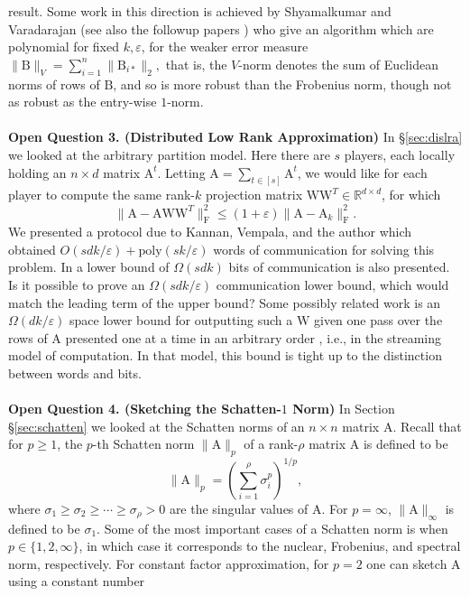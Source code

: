 \documentclass[11pt]{article}
\newcommand{\FNormS}[1]{\mbox{}\|#1\|_\mathrm{F}^2}
\newcommand{\mat}[1]{{\ensuremath{\bm{\mathrm{#1}}}}}
\def\matA{\mat{A}}
\def\matB{\mat{B}}
\def\matW{\mat{W}}
\newcommand{\eps}{\varepsilon}
\newcommand{\poly}{{\mathrm{poly}}}
\begin{document}
result. Some work in this direction is achieved by Shyamalkumar and Varadarajan \cite{SV07} 
(see also the followup papers \cite{DV07,FMSW10,FL11,VX12}) who give an algorithm which
are polynomial for fixed $k,\eps$, for the weaker error measure $\|\matB\|_V = \sum_{i = 1}^n \|\matB_{i*}\|_2,$ that is,
the $V$-norm denotes the sum of Euclidean norms of rows of $\matB$, and so is more robust than the Frobenius norm,
though not as robust as the entry-wise $1$-norm. 
\\\\
{\bf Open Question 3. (Distributed Low Rank Approximation)}
In \S\ref{sec:dislra} we looked at the arbitrary partition model. Here there
are $s$ players, 
each locally holding an $n \times d$ 
matrix $\matA^t$. Letting $\matA = \sum_{t \in [s]} \matA^t$, 
we would like for each player to compute the same rank-$k$ projection
matrix $\matW\matW^T \in \mathbb{R}^{d \times d}$, for which 
$$\FNormS{\matA-\matA\matW\matW^T} \leq (1+\eps)\FNormS{\matA-\matA_k}.$$
We presented a protocol due to Kannan, Vempala, and the author
\cite{kvw14} 
which obtained $O(sdk/\eps) + \poly(sk/\eps)$ words of communication
for solving this problem. In \cite{kvw14} a lower bound of $\Omega(sdk)$ bits
of communication is also presented. Is it possible to prove an 
$\Omega(sdk/\eps)$ communication 
lower bound, which would match the leading term of the
upper bound? Some possibly related work is an $\Omega(dk/\eps)$ 
space lower bound 
for outputting such a $\matW$ given one pass over the rows of $\matA$
presented one at a time in an arbitrary order \cite{w14}, i.e., in the
streaming model of computation. In that model, this bound is
tight up to the distinction between words and bits. 
\\\\
{\bf Open Question 4. (Sketching the Schatten-$1$ Norm)}
In Section \S\ref{sec:schatten} we looked at the Schatten norms of an
$n \times n$ matrix
$\matA$. Recall that for $p \geq 1$, 
the $p$-th Schatten norm $\|\matA\|_p$ of a rank-$\rho$ matrix $\matA$ is 
defined to be 
$$\|\matA\|_p = \left (\sum_{i=1}^{\rho} \sigma_i^p \right)^{1/p},$$
where $\sigma_1 \geq \sigma_2 \geq \cdots \geq \sigma_{\rho} > 0$ 
are the singular values of $\matA$. For
$p = \infty$, $\|\matA\|_{\infty}$ is defined to be $\sigma_1$.
Some of the
most important cases of a Schatten norm is when $p \in \{1, 2, \infty\}$, 
in which case it corresponds to the nuclear, Frobenius, and spectral norm,
respectively. For constant factor approximation, 
for $p = 2$ one can sketch $\matA$ using a constant number
\end{document}
